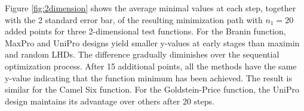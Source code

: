 \documentclass [PhD] {package/uclathes}
\begin{document}
Figure \ref{fig:2dimension} shows the average minimal values at each step, together with the 2 standard error bar, of the resulting minimization path with $n_1=20$ added points for three 2-dimensional test functions.
For the Branin function,  MaxPro and UniPro designs yield smaller y-values at early stages than maximin and random LHDs. The difference gradually diminishes over the sequential optimization process. After 15 additional points, all the methods have the same y-value indicating that the function minimum has been achieved. The result is similar for the Camel Six function. For the Goldstein-Price function,  the UniPro design maintains its advantage over others after 20 steps.







\end{document}

